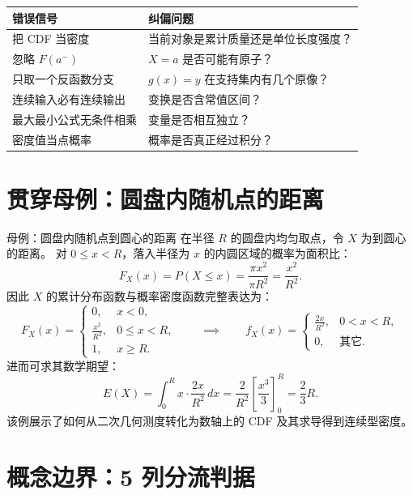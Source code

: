 \documentclass[11pt,a4paper]{ctexart}
\begin{document}
\begin{center}
\begin{tabularx}{\linewidth}{L{4.0cm}Y}
\toprule 错误信号 & 纠偏问题 \\
\midrule
把 CDF 当密度 & 当前对象是累计质量还是单位长度强度？ \\
忽略 $F(a^-)$ & $X=a$ 是否可能有原子？ \\
只取一个反函数分支 & $g(x)=y$ 在支持集内有几个原像？ \\
连续输入必有连续输出 & 变换是否含常值区间？ \\
最大最小公式无条件相乘 & 变量是否相互独立？ \\
密度值当点概率 & 概率是否真正经过积分？ \\
\bottomrule
\end{tabularx}
\end{center}

\section{贯穿母例：圆盘内随机点的距离}

\begin{examplebox}{母例：圆盘内随机点到圆心的距离}
在半径 $R$ 的圆盘内均匀取点，令 $X$ 为到圆心的距离。
对 $0\le x < R$，落入半径为 $x$ 的内圆区域的概率为面积比：
\[
F_X(x) = P(X \le x) = \frac{\pi x^2}{\pi R^2} = \frac{x^2}{R^2}.
\]
因此 $X$ 的累计分布函数与概率密度函数完整表达为：
\[
F_X(x) = \begin{cases}
0, & x < 0, \\
\frac{x^2}{R^2}, & 0 \le x < R, \\
1, & x \ge R.
\end{cases}
\qquad \implies \qquad
f_X(x) = \begin{cases}
\frac{2x}{R^2}, & 0 < x < R, \\
0, & \text{其它}.
\end{cases}
\]
进而可求其数学期望：
\[
E(X) = \int_0^R x \cdot \frac{2x}{R^2} \, dx = \frac{2}{R^2} \left[ \frac{x^3}{3} \right]_0^R = \frac{2}{3} R.
\]
该例展示了如何从二次几何测度转化为数轴上的 CDF 及其求导得到连续型密度。
\end{examplebox}

\section{概念边界：5 列分流判据}
\end{document}
